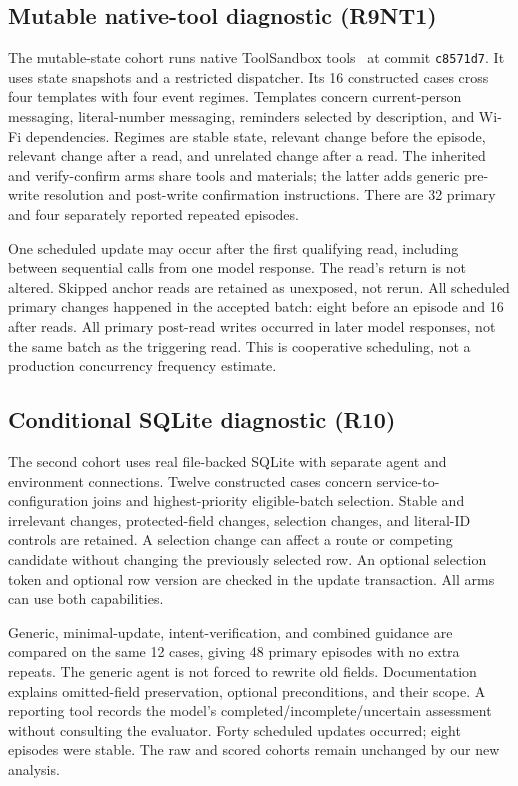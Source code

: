 \documentclass[10pt,letterpaper]{article}
\begin{document}
\subsection{Mutable native-tool diagnostic (R9NT1)}
The mutable-state cohort runs native ToolSandbox tools~\cite{toolsandbox} at commit \texttt{c8571d7}. It uses state snapshots and a restricted dispatcher. Its 16 constructed cases cross four templates with four event regimes. Templates concern current-person messaging, literal-number messaging, reminders selected by description, and Wi-Fi dependencies. Regimes are stable state, relevant change before the episode, relevant change after a read, and unrelated change after a read. The inherited and verify-confirm arms share tools and materials; the latter adds generic pre-write resolution and post-write confirmation instructions. There are 32 primary and four separately reported repeated episodes.

One scheduled update may occur after the first qualifying read, including between sequential calls from one model response. The read's return is not altered. Skipped anchor reads are retained as unexposed, not rerun. All scheduled primary changes happened in the accepted batch: eight before an episode and 16 after reads. All primary post-read writes occurred in later model responses, not the same batch as the triggering read. This is cooperative scheduling, not a production concurrency frequency estimate.

\subsection{Conditional SQLite diagnostic (R10)}
The second cohort uses real file-backed SQLite with separate agent and environment connections. Twelve constructed cases concern service-to-configuration joins and highest-priority eligible-batch selection. Stable and irrelevant changes, protected-field changes, selection changes, and literal-ID controls are retained. A selection change can affect a route or competing candidate without changing the previously selected row. An optional selection token and optional row version are checked in the update transaction. All arms can use both capabilities.

Generic, minimal-update, intent-verification, and combined guidance are compared on the same 12 cases, giving 48 primary episodes with no extra repeats. The generic agent is not forced to rewrite old fields. Documentation explains omitted-field preservation, optional preconditions, and their scope. A reporting tool records the model's completed/incomplete/uncertain assessment without consulting the evaluator. Forty scheduled updates occurred; eight episodes were stable. The raw and scored cohorts remain unchanged by our new analysis.
\end{document}
